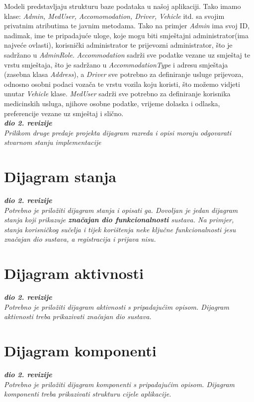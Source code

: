 			{Modeli predstavljaju strukturu baze podataka u našoj aplikaciji. Tako imamo klase: \textit{Admin, MedUser, Accomomodation, Driver, Vehicle} itd. sa svojim privatnim atributima te javnim metodama. Tako na primjer \textit{Admin} ima svoj ID, nadimak, ime te pripadajuće uloge, koje mogu biti smještajni administrator(ima najveće ovlasti), korisnički administrator te prijevozni administrator, što je sadržano u \textit{AdminRole}. \textit{Accommodation} sadrži sve podatke vezane uz smještaj te vrstu smještaja, što je sadržano u \textit{AccommodationType} i adresu smještaja (zasebna klasa \textit{Address}), a \textit{Driver} sve potrebno za definiranje usluge prijevoza, odnosno osobni podaci vozača te vrstu vozila koju koristi, što možemo vidjeti unutar \textit{Vehicle} klase. \textit{MedUser} sadrži sve potrebno za definiranje korisnika medicinskih usluga, njihove osobne podatke, vrijeme dolaska i odlaska, preferencije vezane uz smještaj i slično. }\\
			
			
			
			\textbf{\textit{dio 2. revizije}}\\			
			
			\textit{Prilikom druge predaje projekta dijagram razreda i opisi moraju odgovarati stvarnom stanju implementacije}
			
			
			
			\eject
		
		\section{Dijagram stanja}
			
			
			\textbf{\textit{dio 2. revizije}}\\
			
			\textit{Potrebno je priložiti dijagram stanja i opisati ga. Dovoljan je jedan dijagram stanja koji prikazuje \textbf{značajan dio funkcionalnosti} sustava. Na primjer, stanja korisničkog sučelja i tijek korištenja neke ključne funkcionalnosti jesu značajan dio sustava, a registracija i prijava nisu. }
			
			
			\eject 
		
		\section{Dijagram aktivnosti}
			
			\textbf{\textit{dio 2. revizije}}\\
			
			 \textit{Potrebno je priložiti dijagram aktivnosti s pripadajućim opisom. Dijagram aktivnosti treba prikazivati značajan dio sustava.}
			
			\eject
		\section{Dijagram komponenti}
		
			\textbf{\textit{dio 2. revizije}}\\
		
			 \textit{Potrebno je priložiti dijagram komponenti s pripadajućim opisom. Dijagram komponenti treba prikazivati strukturu cijele aplikacije.}